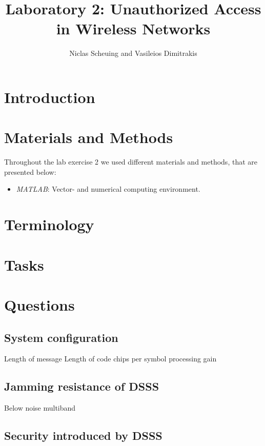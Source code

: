 \documentclass[12pt,a4paper]{article}
\title{Laboratory 2: Unauthorized Access in Wireless Networks}
\author{Niclas Scheuing and Vasileios Dimitrakis}
\begin{document}
	\maketitle
	
	\section{Introduction}
	
	
	\section{Materials and Methods}
	Throughout the lab exercise 2 we used different materials and methods, that are presented below:
	
	\begin{itemize}
		\item \emph{MATLAB}: Vector- and numerical computing environment.
	\end{itemize}
	
	\section{Terminology}
	
	
	\section{Tasks}
	
	\section{Questions}
		\subsection{System configuration}
			Length of message
			Length of code
			chips per symbol
			processing gain
		
		\subsection{Jamming resistance of DSSS}
			Below noise
			multiband
			
		\subsection{Security introduced by DSSS}
		
		\subsection{}
	
\end{document}

